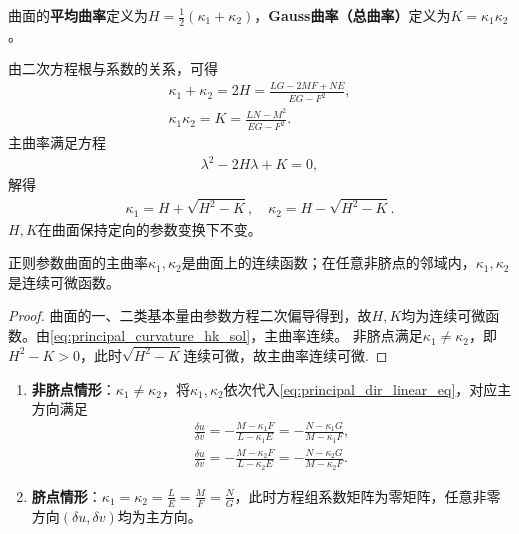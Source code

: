 \documentclass[../../main.tex]{subfiles}%
\begin{document}
\begin{definition}
曲面的\textbf{平均曲率}定义为$H=\frac{1}{2}(\kappa_1+\kappa_2)$，\textbf{Gauss曲率（总曲率）}定义为$K=\kappa_1\kappa_2$。
\end{definition}

由二次方程根与系数的关系，可得
\begin{align}
\kappa_1+\kappa_2=2H=\frac{LG-2MF+NE}{EG-F^2},\label{eq:mean_curvature_formula}\\
\kappa_1\kappa_2=K=\frac{LN-M^2}{EG-F^2}.\label{eq:gauss_curvature_formula}
\end{align}
主曲率满足方程
\begin{align}
\lambda^2-2H\lambda+K=0,\label{eq:principal_curvature_hk_eq}
\end{align}
解得
\begin{align}
\kappa_1=H+\sqrt{H^2-K},\quad \kappa_2=H-\sqrt{H^2-K}.\label{eq:principal_curvature_hk_sol}
\end{align}
$H,K$在曲面保持定向的参数变换下不变。

\begin{theorem}
正则参数曲面的主曲率$\kappa_1,\kappa_2$是曲面上的连续函数；在任意非脐点的邻域内，$\kappa_1,\kappa_2$是连续可微函数。
\end{theorem}
\begin{proof}
曲面的一、二类基本量由参数方程二次偏导得到，故$H,K$均为连续可微函数。由\eqref{eq:principal_curvature_hk_sol}，主曲率连续。
非脐点满足$\kappa_1\neq\kappa_2$，即$H^2-K>0$，此时$\sqrt{H^2-K}$连续可微，故主曲率连续可微.
\end{proof}


\begin{enumerate}[(1)]
\item \textbf{非脐点情形}：$\kappa_1\neq\kappa_2$，将$\kappa_1,\kappa_2$依次代入\eqref{eq:principal_dir_linear_eq}，对应主方向满足
\begin{align}
\frac{\delta u}{\delta v}=-\frac{M-\kappa_1F}{L-\kappa_1E}=-\frac{N-\kappa_1G}{M-\kappa_1F},\label{eq:principal_dir_k1}\\
\frac{\delta u}{\delta v}=-\frac{M-\kappa_2F}{L-\kappa_2E}=-\frac{N-\kappa_2G}{M-\kappa_2F}.\label{eq:principal_dir_k2}
\end{align}
\item \textbf{脐点情形}：$\kappa_1=\kappa_2=\frac{L}{E}=\frac{M}{F}=\frac{N}{G}$，此时方程组系数矩阵为零矩阵，任意非零方向$(\delta u,\delta v)$均为主方向。
\end{enumerate}
\end{document}
